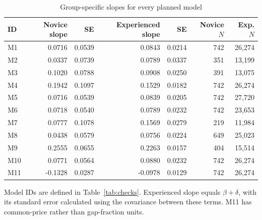 \documentclass[11pt,a4paper]{article}
\begin{document}
\begin{table}[htbp]
\centering\small
\caption{Group-specific slopes for every planned model}\label{tab:group}
\begin{tabular}{lrrrrrr}
\toprule
ID & Novice slope & SE & Experienced slope & SE & Novice $N$ & Exp. $N$ \\
\midrule
M1 & 0.0716 & 0.0539 & 0.0843 & 0.0214 & 742 & 26,274 \\
M2 & 0.0337 & 0.0739 & 0.0789 & 0.0337 & 351 & 13,199 \\
M3 & 0.1020 & 0.0788 & 0.0908 & 0.0250 & 391 & 13,075 \\
M4 & 0.1942 & 0.1097 & 0.1529 & 0.0182 & 742 & 26,274 \\
M5 & 0.0716 & 0.0539 & 0.0839 & 0.0205 & 742 & 27,720 \\
M6 & 0.0718 & 0.0540 & 0.0789 & 0.0232 & 742 & 23,653 \\
M7 & 0.0777 & 0.1078 & 0.1569 & 0.0279 & 219 & 11,984 \\
M8 & 0.0438 & 0.0579 & 0.0756 & 0.0224 & 649 & 25,023 \\
M9 & 0.2555 & 0.0655 & 0.2263 & 0.0157 & 404 & 15,514 \\
M10 & 0.0771 & 0.0564 & 0.0880 & 0.0232 & 742 & 26,274 \\
M11 & -0.1328 & 0.0287 & -0.0978 & 0.0129 & 742 & 26,274 \\
\bottomrule
\end{tabular}
\par\vspace{4pt}\begin{minipage}{\linewidth}\footnotesize Model IDs are defined in Table~\ref{tab:checks}. Experienced slope equals $\beta+\delta$, with its standard error calculated using the covariance between these terms. M11 has common-price rather than gap-fraction units.\end{minipage}
\end{table}
\end{document}

